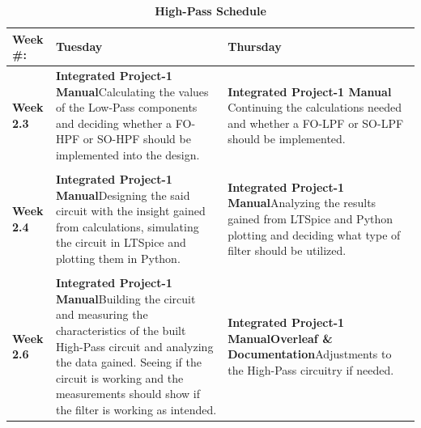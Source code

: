 \newpage
\begin{table}[h!]

\centering

\captionsetup{justification=centering, labelfont=bf}
\caption{\textbf{High-Pass Schedule}}
\begin{tabular*}{\textwidth}{@{\extracolsep{\fill}} p{} p{} p{} @{}} 
\toprule
     \textbf{Week \#:} & \textbf{Tuesday} & \textbf{Thursday} \\
     \midrule
     {\textbf{Week 2.3 }}& \textbf{Integrated Project-1 Manual}\newline Calculating the values of the Low-Pass components and deciding whether a FO-HPF or SO-HPF should be implemented into the design.& \textbf{Integrated Project-1 Manual} \newline Continuing the calculations needed and whether a FO-LPF or SO-LPF should be implemented.\\
     \vspace{10pt}\\
    {\textbf{Week 2.4}} & \textbf{Integrated Project-1 Manual}\newline Designing the said circuit with the insight gained from calculations, simulating the circuit in LTSpice and plotting them in Python.& \textbf{Integrated Project-1 Manual}\newline Analyzing the results gained from LTSpice and Python plotting and deciding what type of filter should be utilized.\\
     \vspace{10pt}\\
     {\textbf{Week 2.6}} & \textbf{Integrated Project-1 Manual}\newline Building the circuit and measuring the characteristics of the built High-Pass circuit and analyzing the data gained. Seeing if the circuit is working and the measurements should show if the filter is working as intended.& \textbf{Integrated Project-1 Manual\newline Overleaf \& Documentation}\newline Adjustments to the High-Pass circuitry if needed.\\
     \bottomrule
\end{tabular*}

\label{tab:HighPass schedule}
\end{table}
